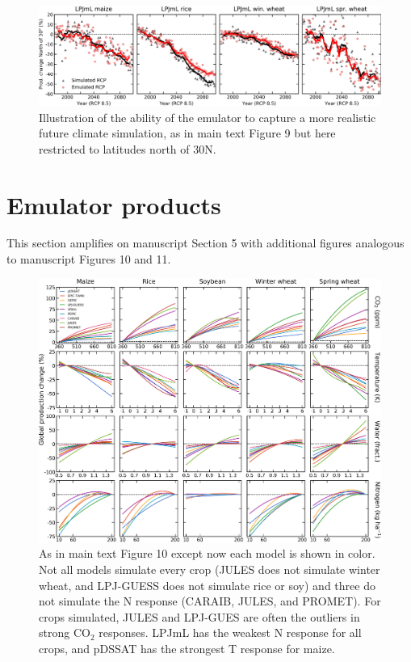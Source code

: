 \documentclass[12pt]{article}
\begin{document}
\vspace{0.5in}
\begin{figure}[h!]
  \centering
  \includegraphics[width = 16.3cm]{LPJMLRCP85comp_30N.png}
  \caption{
  Illustration of the ability of the emulator to capture a more realistic future climate simulation, as in main text Figure 9 but here restricted to latitudes north of 30N.}
  \label{fig:lpjmlrcp}
\end{figure}

\clearpage
\section{Emulator products}
\begin{justify}
This section amplifies on manuscript Section 5 with additional figures analogous to manuscript Figures 10 and 11. 
\end{justify}

\vspace{0.3in}

\begin{figure}[h!]
  \centering
  \includegraphics[width = 16.3cm]{em_CTWN_all_crops_color.png}
  \caption{
	  As in main text Figure 10 except now each model is shown in color. Not all models simulate every crop (JULES does not simulate winter wheat, and LPJ-GUESS does not simulate rice or soy) and three do not simulate the N response (CARAIB, JULES, and PROMET). For crops simulated, JULES and LPJ-GUES are often the outliers in strong CO$_2$ responses. LPJmL has the weakest N response for all crops, and pDSSAT has the strongest T response for maize.  
  }
  \label{fig:all_dims}
\end{figure}
\end{document}
